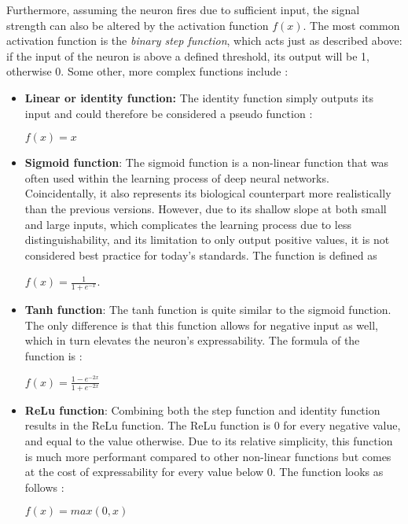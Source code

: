 \documentclass[draft,final]{vutinfth} %
\begin{document}
Furthermore, assuming the neuron fires due to sufficient input, the signal strength can also be altered by the activation function $f(x)$. The most common activation function is the \emph{binary step function}, which acts just as described above: if the input of the neuron is above a defined threshold, its output will be 1, otherwise 0. Some other, more complex functions include \cite{wang2020influence}:
\begin{itemize}
\item \textbf{Linear or identity function:} The identity function simply outputs its input and could therefore be considered a pseudo function \cite{kiaei2023active}: 

\begin{center}
$f(x)=x$
\end{center}

\item \textbf{Sigmoid function}: The sigmoid function is a non-linear function that was often used within the learning process of deep neural networks. Coincidentally, it also represents its biological counterpart more realistically than the previous versions. However, due to its shallow slope at both small and large inputs, which complicates the learning process due to less distinguishability, and its limitation to only output positive values, it is not considered best practice for today's standards. The function is defined as \cite{tsai2015hardware}
\begin{center}
$f(x)=\frac{1}{1+e^{-x}}$.
\end{center}

\item \textbf{Tanh function}: The tanh function is quite similar to the sigmoid function. The only difference is that this function allows for negative input as well, which in turn elevates the neuron's expressability. The formula of the function is \cite{tsai2015hardware}:
\begin{center}
$f(x)=\frac{1-e^{-2x}}{1+e^{-2x}}$
\end{center} 

\item \textbf{ReLu function}: Combining both the step function and identity function results in the ReLu function. The ReLu function is 0 for every negative value, and equal to the value otherwise. Due to its relative simplicity, this function is much more performant compared to other non-linear functions but comes at the cost of expressability for every value below 0. The function looks as follows \cite{bai2022relu}:
\begin{center}
$f(x)=max(0,x)$
\end{center}


\end{itemize}
\end{document}
